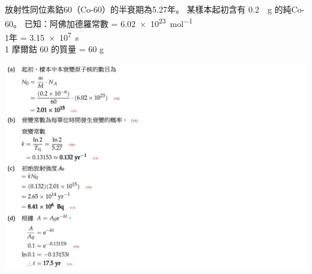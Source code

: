 {
    放射性同位素鈷60（Co-60）的半衰期為5.27年。 某樣本起初含有  \qty{0.2}{\mu g} 的純Co-60。
    已知：阿佛加德羅常數 =  \qty{6.02e23}{mol^{-1}} \\
    1年 =  \qty{3.15e7}{s} \\
    1 摩爾鈷 60 的質量 = 60 g
}{
    \par{\par\centering\includegraphics[width=\textwidth]{./img/ch2_decay_lq_2024-06-17-23-07-47.png}\par}
}

